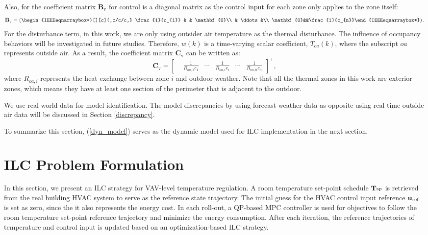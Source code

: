 \documentclass[conference]{IEEEtran}
\begin{document}
Also, for the coefficient matrix $\mathbf{B}_{\textrm{v}}$ for control is a diagonal matrix as the control input for each zone only applies to the zone itself:
\begin{equation*}
\mathbf{B}_{\textrm{v}} = \left(\begin{IEEEeqnarraybox*}[][c]{,c/c/c,}
\frac{1}{c_{1}} &  & \mathbf{0}\\
& \ddots &\\
\mathbf{0}&&\frac{1}{c_{n}}%
\end{IEEEeqnarraybox*}\right).
\end{equation*}
For the disturbance term, in this work, we are only using outsider air temperature as the thermal disturbance. The influence of occupancy behaviors will be investigated in future studies. Therefore, $w(k)$ is a time-varying scalar coefficient, $T_{oa}(k)$, where the subscript $oa$ represents outside air.
As a result, the coefficient matrix $\mathbf{C}_{\textrm{v}}$ can be written as:
\begin{equation*}
    \mathbf{C}_{\textrm{v}} = \begin{bmatrix}
         & \frac{1}{R_{oa,1}c_{1}} & \cdots & \frac{1}{R_{oa,i}c_{i}} & \cdots & \frac{1}{R_{oa,n}c_{n}}
    \end{bmatrix}^\top,
\end{equation*}
where $R_{oa,i}$ represents the heat exchange between zone $i$ and outdoor weather. Note that all the thermal zones in this work are exterior zones, which means they have at least one section of the perimeter that is adjacent to the outdoor.

We use real-world data for model identification. The model discrepancies by using forecast weather data as opposite using real-time outside air data will be discussed in Section \ref{discrepancy}.

To summarize this section, (\ref{dyn_model}) serves as the dynamic model used for ILC implementation in the next section.

\section{ILC Problem Formulation}
In this section, we present an ILC strategy for VAV-level temperature regulation. A room temperature set-point schedule $\mathbf{T}_{\textsuperscript{sp}}$ is retrieved from the real building HVAC system to serve as the reference state trajectory. The initial guess for the HVAC control input reference $\mathbf{u}_{\textsuperscript{ref}}$ is set as zero, since the it also represents the energy cost. In each roll-out, a QP-based MPC controller is used for objectives to follow the room temperature set-point reference trajectory and minimize the energy consumption. After each iteration, the reference trajectories of temperature and control input is updated based on an optimization-based ILC strategy.
\end{document}
